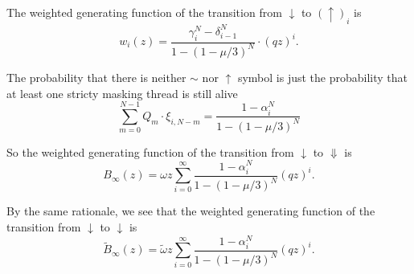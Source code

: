 \documentclass{article}
\begin{document}
The weighted generating function of the transition from $\downarrow$ to
$(\uparrow)_i$ is
\begin{equation}
w_i(z) = \frac{\gamma_i^N- \delta_{i-1}^N}{1-(1-\mu/3)^N} \cdot (qz)^i.
\end{equation}

%

The probability that there is neither $\sim$ nor $\uparrow$ symbol is just
the probability that at least one stricty masking thread is still alive
\begin{equation}
\sum_{m=0}^{N-1}Q_m \cdot \xi_{i,N-m} = \frac{1-\alpha_i^N}{1-(1-\mu/3)^N}
\end{equation}

So the weighted generating function of the transition from $\downarrow$ to
$\Downarrow$ is
\begin{equation}
B_\infty(z) = \omega z\sum_{i=0}^\infty
\frac{1-\alpha_i^N}{1-(1-\mu/3)^N} (qz)^i.
\end{equation}

By the same rationale, we see that the weighted generating function of the
transition from $\downarrow$ to $\downarrow$ is
\begin{equation}
\tilde{B}_\infty(z) = \tilde{\omega} z\sum_{i=0}^\infty
\frac{1-\alpha_i^N}{1-(1-\mu/3)^N} (qz)^i.
\end{equation}
\end{document}
